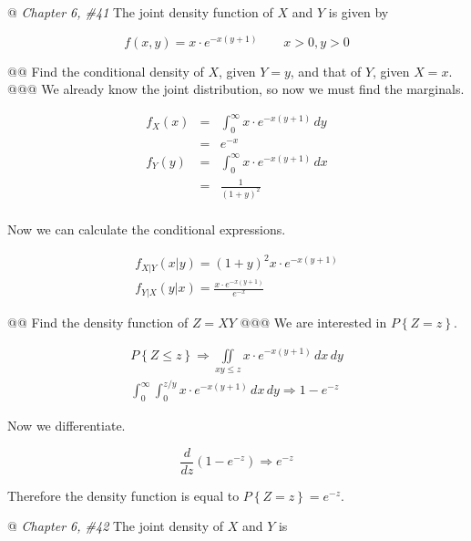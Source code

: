 \documentclass[11pt]{article}\usepackage[]{graphicx}\usepackage[]{xcolor}
\begin{document}
\begin{easylist}[enumerate]
    @ \textit{Chapter 6, \#41} The joint density function of $X$ and $Y$ is given by

    \[
        f(x, y) = x \cdot e^{-x \left( y + 1 \right)} \qquad x > 0, y > 0
    \]

    @@ Find the conditional density of $X$, given $Y = y$, and that of $Y$, given $X =x$.
    @@@ We already know the joint distribution, so now we must find the marginals.

    \[
        \begin{aligned}
            f_X(x) &=& \int_0^\infty x \cdot e^{-x \left( y + 1 \right)} \, dy\\
                    &=& e^{-x}\\
            f_Y(y) &=& \int_0^\infty x \cdot e^{-x \left( y + 1 \right)} \, dx\\
                    &=& \frac{1}{{\left( 1 + y \right)}^2}\\
        \end{aligned}
    \]

    Now we can calculate the conditional expressions.

    \[
        \begin{aligned}
            f_{X|Y}\left( x|y \right) =
                {\left( 1 + y \right)}^2 x \cdot e^{-x \left( y + 1 \right)}\\
            f_{Y|X}\left( y|x \right) =
                \frac{x \cdot e^{-x \left( y + 1 \right)}}{e^{-x}}
        \end{aligned}
    \]

    @@ Find the density function of $Z = XY$
    @@@ We are interested in $P\left\{ Z = z \right\}$.

    \[
        \begin{aligned}
            P\left\{ Z \le z \right\} \Rightarrow
                \iint\limits_{xy \le z} x \cdot e^{-x \left( y + 1 \right)} \, dx \, dy\\
            \int_0^\infty \int_0^{z/y} x \cdot e^{-x \left( y + 1 \right)} \, dx \, dy \Rightarrow 1 - e^{-z}
        \end{aligned}
    \]

    Now we differentiate.

    \[
        \frac{d}{dz} \left( 1 - e^{-z} \right) \Rightarrow e^{-z}
    \]

    Therefore the density function is equal to $P\left\{ Z = z \right\} = e^{-z}$.

    @ \textit{Chapter 6, \#42} The joint density of $X$ and $Y$ is


\end{easylist}
\end{document}
